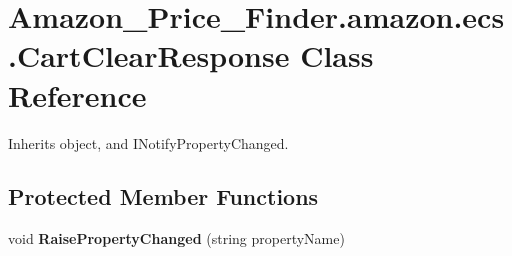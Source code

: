 \hypertarget{class_amazon___price___finder_1_1amazon_1_1ecs_1_1_cart_clear_response}{\section{Amazon\-\_\-\-Price\-\_\-\-Finder.\-amazon.\-ecs.\-Cart\-Clear\-Response Class Reference}
\label{class_amazon___price___finder_1_1amazon_1_1ecs_1_1_cart_clear_response}
}


 




Inherits object, and I\-Notify\-Property\-Changed.

\subsection*{Protected Member Functions}
\begin{DoxyCompactItemize}
\item 
\hypertarget{class_amazon___price___finder_1_1amazon_1_1ecs_1_1_cart_clear_response_a9247e9538d3731fa34277f78f6ef712f}{void {\bfseries Raise\-Property\-Changed} (string property\-Name)}\label{class_amazon___price___finder_1_1amazon_1_1ecs_1_1_cart_clear_response_a9247e9538d3731fa34277f78f6ef712f}

\end{DoxyCompactItemize}
